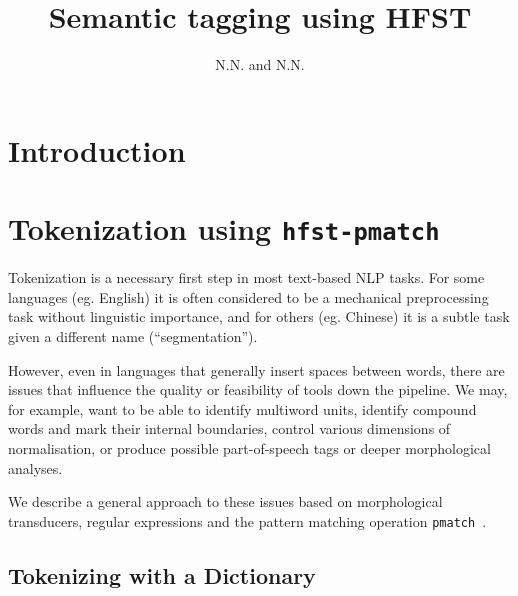 \documentclass{llncs}
\begin{document}
%
\title{Semantic tagging using HFST}
%
\author{N.N. and N.N.}


\maketitle


\begin{abstract}
\end{abstract}

\section*{Introduction}

\section{Tokenization using {\tt hfst-pmatch}}\label{sec:tokenization}
Tokenization is a necessary first step in most text-based NLP tasks. For some
languages (eg. English) it is often considered to be a mechanical
preprocessing task without linguistic importance, and for others (eg. Chinese)
it is a subtle task given a different name (``segmentation'').

However, even in languages that generally insert spaces between words, there
are issues that influence the quality or feasibility of tools down the
pipeline. We may, for example, want to be able to identify multiword units,
identify compound words and mark their internal boundaries, control various
dimensions of normalisation, or produce possible part-of-speech tags or
deeper morphological analyses.

We describe a general approach to these issues based on morphological
transducers, regular expressions and the pattern matching operation
\verb+pmatch+~\cite{pmatchcite}.

\subsection{Tokenizing with a Dictionary}
\end{document}

